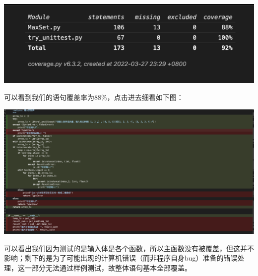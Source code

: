 \documentclass{article}
\begin{document}
\begin{center}
   \includegraphics[scale = 0.8]{5}
\end{center}
可以看到我们的语句覆盖率为88\%，点击进去细看如下图：
\begin{center}
   \includegraphics[scale = 0.2]{4}
\end{center}
可以看出我们因为测试的是输入体是各个函数，所以主函数没有被覆盖，但这并不影响；剩下的是为了可能出现的计算机错误（而非程序自身bug）准备的错误处理，这一部分无法通过样例测试，故整体语句基本全部覆盖。
\end{document}

